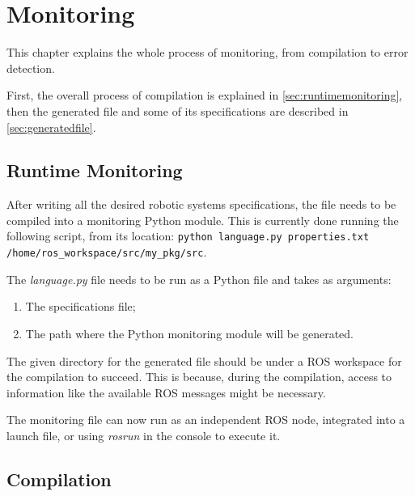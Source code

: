 \chapter{Monitoring}
\label{chap:monitoring}

This chapter explains the whole process of monitoring, from compilation to error detection. 

First, the overall process of compilation is explained in \autoref{sec:runtimemonitoring}, then the generated file and some of its specifications are described in \autoref{sec:generatedfile}.


\section{Runtime Monitoring}
\label{sec:runtimemonitoring}

After writing all the desired robotic systems specifications, the file needs to be compiled into a monitoring Python module. This is currently done running the following script, from its location: \lstinline{python language.py properties.txt /home/ros_workspace/src/my_pkg/src}.

The \textit{language.py} file needs to be run as a Python file and takes as arguments:

\begin{enumerate}
    \item The specifications file;
    \item The path where the Python monitoring module will be generated.
\end{enumerate}

The given directory for the generated file should be under a ROS workspace for the compilation to succeed. This is because, during the compilation, access to information like the available ROS messages might be necessary.

The monitoring file can now run as an independent ROS node, integrated into a launch file, or using \textit{rosrun} in the console to execute it.


\section{Compilation} 
\label{sec:generatedfile}

